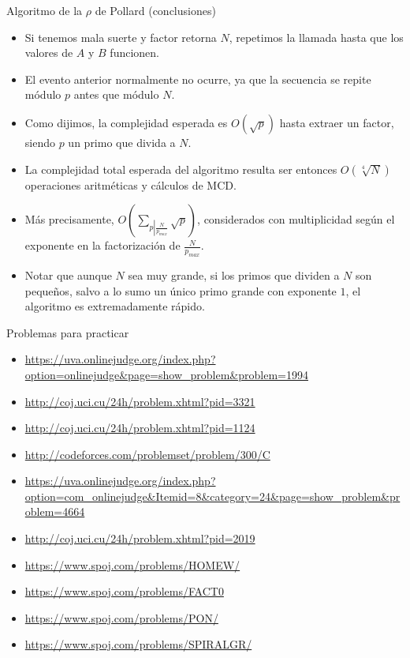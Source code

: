 \documentclass{beamer}
\begin{document}
\begin{frame}{Algoritmo de la $\rho$ de Pollard (conclusiones)}

    \begin{itemize}
      \item Si tenemos mala suerte y factor retorna $N$, repetimos la llamada hasta que los valores de $A$ y $B$ funcionen.
      \item El evento anterior normalmente no ocurre, ya que la secuencia se repite módulo $p$ antes que módulo $N$.
      \item Como dijimos, la complejidad esperada es $O(\sqrt{p})$ hasta extraer un factor, siendo $p$ un primo que divida a $N$.
      \item La complejidad total esperada del algoritmo resulta ser entonces $O \left (\sqrt[4]{N} \right )$ operaciones aritméticas y cálculos de MCD.
      \item Más precisamente, $O \left (\sum_{p \left |\frac{N}{p_{max}} \right .}{\sqrt p} \right )$, considerados con multiplicidad según el exponente en la factorización de $\frac{N}{p_{max}}$.
      \item Notar que aunque $N$ sea muy grande, si los primos que dividen a $N$ son pequeños, salvo a lo sumo un único primo grande con exponente $1$, el algoritmo es extremadamente rápido.
    \end{itemize}
\end{frame}

\begin{frame}{Problemas para practicar}

    \begin{itemize}
 \item \url{https://uva.onlinejudge.org/index.php?option=onlinejudge&page=show_problem&problem=1994}
 \item \url{http://coj.uci.cu/24h/problem.xhtml?pid=3321}
 \item \url{http://coj.uci.cu/24h/problem.xhtml?pid=1124}
 \item \url{http://codeforces.com/problemset/problem/300/C}
 \item \url{https://uva.onlinejudge.org/index.php?option=com_onlinejudge&Itemid=8&category=24&page=show_problem&problem=4664}
 \item \url{http://coj.uci.cu/24h/problem.xhtml?pid=2019}
 \item \url{https://www.spoj.com/problems/HOMEW/}
 \item \url{https://www.spoj.com/problems/FACT0}
 \item \url{https://www.spoj.com/problems/PON/}
 \item \url{https://www.spoj.com/problems/SPIRALGR/}
    \end{itemize}
\end{frame}
\end{document}
